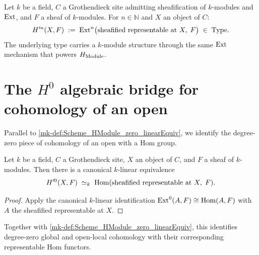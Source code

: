 \begin{definition}\label{mk-def:Scheme_HModule_prime}
  \leanok


  Let \(k\) be a field, \(C\) a Grothendieck site admitting sheafification of \(k\)-modules and \(\operatorname{Ext}\), and \(F\) a sheaf of \(k\)-modules. For \(n \in \mathbb N\) and \(X\) an object of \(C\):
  \[
    H^{\prime n}(X, F) \;:=\; \operatorname{Ext}^n\bigl(\text{sheafified representable at }X,\; F\bigr) \;\in\; \mathrm{Type}.
  \]
  The underlying type carries a \(k\)-module structure through the same \(\operatorname{Ext}\) mechanism that powers \(H_{\mathrm{Module}}\).
\end{definition}

\section{The \(H^0\) algebraic bridge for cohomology of an open}
\label{mk-sec:hmodule_prime_zero}

Parallel to \ref{mk-def:Scheme_HModule_zero_linearEquiv}, we identify the degree-zero piece of cohomology of an open with a Hom group.

\begin{definition}\label{mk-def:Scheme_HModule_prime_zero_linearEquiv}
  \leanok


  Let \(k\) be a field, \(C\) a Grothendieck site, \(X\) an object of \(C\), and \(F\) a sheaf of \(k\)-modules. Then there is a canonical \(k\)-linear equivalence
  \[
    H^{\prime 0}(X, F) \;\simeq_k\; \operatorname{Hom}(\text{sheafified representable at }X,\; F).
  \]
\end{definition}

\begin{proof}
  \leanok

  Apply the canonical \(k\)-linear identification \(\operatorname{Ext}^0(A,F) \cong \operatorname{Hom}(A,F)\) with \(A\) the sheafified representable at \(X\).
\end{proof}

Together with \ref{mk-def:Scheme_HModule_zero_linearEquiv}, this identifies degree-zero global and open-local cohomology with their corresponding representable Hom functors.


